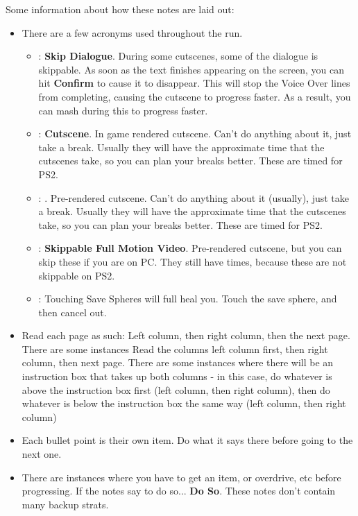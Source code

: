 Some information about how these notes are laid out:

\begin{itemize}
    \item There are a few acronyms used throughout the run.
    \begin{itemize}
        \item \sd: \textbf{Skip Dialogue}. During some cutscenes, some of the dialogue is skippable. As soon as the text finishes appearing on the screen, you can hit \textbf{Confirm} to cause it to disappear. This will stop the Voice Over lines from completing, causing the cutscene to progress faster. As a result, you can mash during this to progress faster.
        \item \cs: \textbf{Cutscene}. In game rendered cutscene. Can't do anything about it, just take a break. Usually they will have the approximate time that the cutscenes take, so you can plan your breaks better. These are timed for PS2.
        \item \fmv: . Pre-rendered cutscene. Can't do anything about it (usually), just take a break. Usually they will have the approximate time that the cutscenes take, so you can plan your breaks better. These are timed for PS2.
        \item \skippablefmv: \textbf{Skippable Full Motion Video}. Pre-rendered cutscene, but you can skip these if you are on PC. They still have times, because these are not skippable on PS2.
        \item \save: Touching Save Spheres will full heal you. Touch the save sphere, and then cancel out.
    \end{itemize}
    \item Read each page as such: Left column, then right column, then the next page. There are some instances Read the columns left column first, then right column, then next page. There are some instances where there will be an instruction box that takes up both columns - in this case, do whatever is above the instruction box first (left column, then right column), then do whatever is below the instruction box the same way (left column, then right column)
    \item Each bullet point is their own item. Do what it says there before going to the next one.
    \item There are instances where you have to get an item, or overdrive, etc before progressing. If the notes say to do so... \textbf{Do So}. These notes don't contain many backup strats.
\end{itemize}

